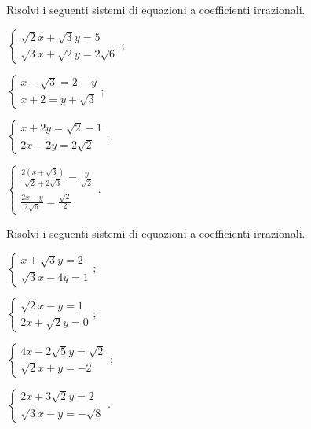 \begin{esercizio}[\Ast]
 \label{ese:2.106}
Risolvi i seguenti sistemi di equazioni a coefficienti irrazionali.
 \begin{multicols}{2}
 \begin{enumeratea}
 \item $\left\{\begin{array}{l}{\sqrt 2x+\sqrt 3y=5}\\
 {\sqrt 3x+\sqrt 2y=2\sqrt 6} \end{array}\right.;$
 \item $\left\{\begin{array}{l}{x-\sqrt 3=2-y}\\
 {x+2=y+\sqrt 3} \end{array}\right.;$
 \item $\left\{\begin{array}{l}{x+2y=\sqrt 2-1}\\
 {2x-2y=2\sqrt 2} \end{array}\right.;$
 \item $\left\{\begin{array}{l}{\frac{2\left(x+\sqrt 3\right)}{\sqrt 2+2\sqrt 3}=\frac y{\sqrt 2}}\\
 {\frac{2x-y}{2\sqrt 6}=\frac{\sqrt 2} 2} \end{array}\right..$
 \end{enumeratea}
 \end{multicols}
\end{esercizio}

\begin{esercizio}[\Ast]
 \label{ese:2.107}
Risolvi i seguenti sistemi di equazioni a coefficienti irrazionali.
 \begin{multicols}{2}
 \begin{enumeratea}
 \item $\left\{\begin{array}{l}x+\sqrt 3y=2\\
 \sqrt 3x-4y=1 \end{array}\right.;$
 \item $\left\{\begin{array}{l}\sqrt 2x-y=1\\
 2x+\sqrt 2y=0 \end{array}\right.;$
 \item $\left\{\begin{array}{l}4x-2\sqrt 5y=\sqrt 2\\
 \sqrt 2x+y=-2 \end{array}\right.;$
 \item $\left\{\begin{array}{l}2x+3\sqrt 2y=2\\
 \sqrt 3x-y=-\sqrt 8 \end{array}\right..$
 \end{enumeratea}
 \end{multicols}
\end{esercizio}

